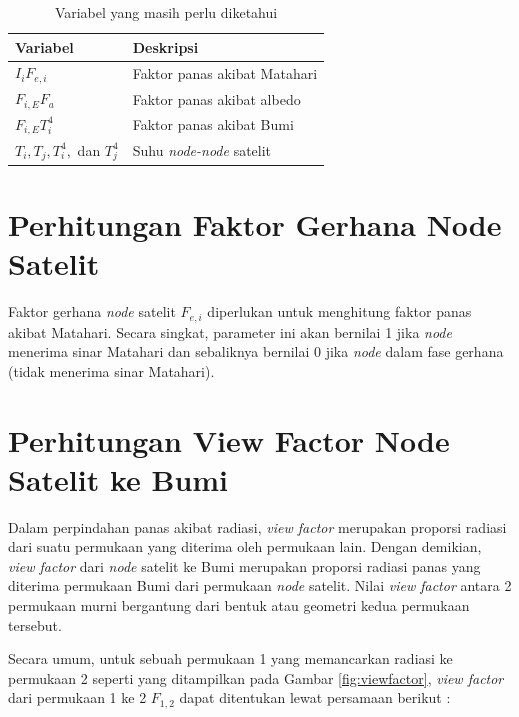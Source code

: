 \begin{table}[!ht]
\begin{center}
\caption{Variabel yang masih perlu diketahui}
\label{table:unknown}
\begin{tabular}{|l|l|}
\hline
Variabel & Deskripsi \\ \hline
	$I_i F_{e,i}$        & Faktor panas akibat Matahari         \\ \hline
	$F_{i,E} F_a$        & Faktor panas akibat albedo         \\ \hline
	$F_{i,E} T_i^4$        & Faktor panas akibat Bumi         \\ \hline
	$T_i, T_j, T_i^4,$ dan $T_j^4$        & Suhu \textit{node-node} satelit         \\ \hline
\end{tabular}
\end{center}
\vspace{-5mm}
\end{table}

\section{Perhitungan Faktor Gerhana Node Satelit}

Faktor gerhana \textit{node} satelit $F_{e,i}$ diperlukan untuk menghitung faktor panas
akibat Matahari. Secara singkat, parameter ini akan bernilai 1 jika \textit{node}
menerima sinar Matahari dan sebaliknya bernilai 0 jika \textit{node} dalam fase gerhana
(tidak menerima sinar Matahari).

\section{Perhitungan View Factor Node Satelit ke Bumi}

Dalam perpindahan panas akibat radiasi, \textit{view factor} merupakan proporsi
radiasi dari suatu permukaan yang diterima oleh permukaan lain. Dengan
demikian, \textit{view factor} dari \textit{node} satelit ke Bumi merupakan
proporsi radiasi panas yang diterima permukaan Bumi dari permukaan
\textit{node} satelit. Nilai \textit{view factor} antara 2 permukaan murni
bergantung dari bentuk atau geometri kedua permukaan tersebut.

Secara umum, untuk sebuah permukaan 1 yang memancarkan radiasi ke permukaan 2 seperti yang
ditampilkan pada Gambar \ref{fig:viewfactor}, \textit{view factor} dari
permukaan 1 ke 2 $F_{1,2}$ dapat ditentukan lewat persamaan berikut
\cite{muneer2020}:

